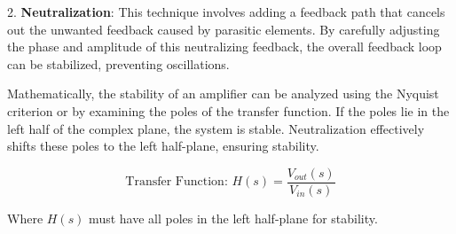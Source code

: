 2. \textbf{Neutralization}: This technique involves adding a feedback path that cancels out the unwanted feedback caused by parasitic elements. By carefully adjusting the phase and amplitude of this neutralizing feedback, the overall feedback loop can be stabilized, preventing oscillations.

Mathematically, the stability of an amplifier can be analyzed using the Nyquist criterion or by examining the poles of the transfer function. If the poles lie in the left half of the complex plane, the system is stable. Neutralization effectively shifts these poles to the left half-plane, ensuring stability.

\[
\text{Transfer Function: } H(s) = \frac{V_{out}(s)}{V_{in}(s)}
\]

Where \( H(s) \) must have all poles in the left half-plane for stability.

